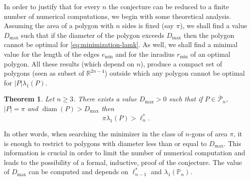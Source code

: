 \documentclass[JEP,XML,SOM,Unicode,ThmDefs,NoFloatCountersInSection,published]{cedram}
\theoremstyle{plain}
\newtheorem{thm}{Theorem}[section]
\theoremstyle{definition}
\newcommand{\diam}{\operatorname{diam}}
\def\R{\mathbb{R}}
\newcommand{\lb}{\lambda}
\newcommand{\ov}{\overline}
\begin{document}
In order to justify that for every $n$ the conjecture can be reduced to a finite number of numerical computations, we begin with some theoretical analysis. Assuming the area of a polygon with $n$ sides is fixed (say $\pi$), we shall find a value $D_{\max}$ such that if the diameter of the polygon exceeds $D_{\max}$ then the polygon cannot be optimal for \eqref{eq:minimization-lamk}. As well, we shall find a minimal value for the length of the edges $e_{\min}$ and for the inradius $r_{\min}$ of an optimal polygon. All these results (which depend on $n$), produce a compact set of polygons (seen as subset of $\R^{2n-4}$) outside which any polygon cannot be optimal for $|P|\lb_1(P)$.

\begin{thm}\label{bobu47}
Let $n\ge 3$. There exists a value $D_{\max} >0$ such that if $P \in \ov {\mathcal P}_n$, $|P|=\pi$ and $\diam (P) > D_{\max}$ then
\[
\pi \lambda_1(P) > \ell_{n}^*.
\]
\end{thm}
In other words, when searching the minimizer in the class of $n$-gons of area $\pi$, it is enough to restrict to polygons with diameter less than or equal to $D_{\max}$. This information is crucial in order to limit the number of numerical computation and leads to the possibility of a formal, inductive, proof of the conjecture. The value of $D_{\max}$ can be computed and depends on $\ell^*_{n-1}$ and $\lb_1(\mathbb P_n)$.
\end{document}
